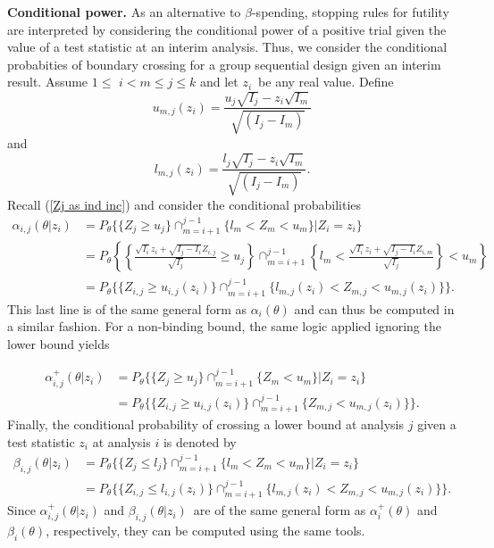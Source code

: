 \textbf{Conditional power. }As an alternative to $\beta$-spending, stopping
rules for futility are interpreted by considering the conditional power of a
positive trial given the value of a test statistic at an interim analysis.
Thus, we consider the conditional probabities of boundary crossing for a group
sequential design given an interim result. Assume $1\leq$ $i<m\leq j\leq k$
and let $z_{i}$\ be any real value. Define%
\begin{equation}
u_{m,j}(z_{i})=\frac{u_{j}\sqrt{I_{j}}-z_{i}\sqrt{I_{m}}}{\sqrt{(I_{j}-I_{m}%
)}}\label{umj}%
\end{equation}
and
\begin{equation}
l_{m,j}(z_{i})=\frac{l_{j}\sqrt{I_{j}}-z_{i}\sqrt{I_{m}}}{\sqrt{(I_{j}-I_{m}%
)}}.\label{lmj}%
\end{equation}
Recall (\ref{Zj as ind inc}) and consider the conditional probabilities%
\begin{align}
\alpha_{i,j}(\theta|z_{i})  & =P_{\theta}\{\{Z_{j}\geqslant u_{j}%
\}\cap_{m=i+1}^{j-1}\{l_{m}<Z_{m}<u_{m}\}|Z_{i}=z_{i}%
\}\label{Cond lower bound prob}\\
& =P_{\theta}\left\{  \left\{  \frac{\sqrt{I_{i}}z_{i}+\sqrt{I_{j}-I_{i}%
}Z_{i,j}}{\sqrt{I_{j}}}\geqslant u_{j}\right\}  \cap_{m=i+1}^{j-1}\left\{
l_{m}<\frac{\sqrt{I_{i}}z_{i}+\sqrt{I_{j}-I_{i}}Z_{i,m}}{\sqrt{I_{j}}%
}\right\}  <u_{m}\right\} \nonumber\\
& =P_{\theta}\{\{Z_{i,j}\geqslant u_{i,j}(z_{i})\}\cap_{m=i+1}^{j-1}%
\{l_{m,j}(z_{i})<Z_{m,j}<u_{m,j}(z_{i})\}\}.\nonumber
\end{align}
This last line is of the same general form as $\alpha_{i}(\theta)$ and can
thus be computed in a similar fashion. For a non-binding bound, the same logic
applied ignoring the lower bound yields%

\begin{align}
\alpha_{i,j}^{+}(\theta|z_{i})  & =P_{\theta}\{\{Z_{j}\geqslant u_{j}%
\}\cap_{m=i+1}^{j-1}\{Z_{m}<u_{m}\}|Z_{i}=z_{i}\}\label{alphaij+}\\
& =P_{\theta}\{\{Z_{i,j}\geqslant u_{i,j}(z_{i})\}\cap_{m=i+1}^{j-1}%
\{Z_{m,j}<u_{m,j}(z_{i})\}\}.\nonumber
\end{align}
Finally, the conditional probability of crossing a lower bound at analysis $j
$ given a test statistic $z_{i}$ at analysis $i$ is denoted by%
\begin{align}
\beta_{i,j}(\theta|z_{i})  & =P_{\theta}\{\{Z_{j}\leq l_{j}\}\cap
_{m=i+1}^{j-1}\{l_{m}<Z_{m}<u_{m}\}|Z_{i}=z_{i}\}\label{Conditional power}\\
& =P_{\theta}\{\{Z_{i,j}\leq l_{i,j}(z_{i})\}\cap_{m=i+1}^{j-1}\{l_{m,j}%
(z_{i})<Z_{m,j}<u_{m,j}(z_{i})\}\}.\nonumber
\end{align}
Since $\alpha_{i,j}^{+}(\theta|z_{i})$ and $\beta_{i,j}(\theta|z_{i})$\ are of
the same general form as $\alpha_{i}^{+}(\theta)$ and $\beta_{i}(\theta)$,
respectively, they can be computed using the same tools.

\bigskip
